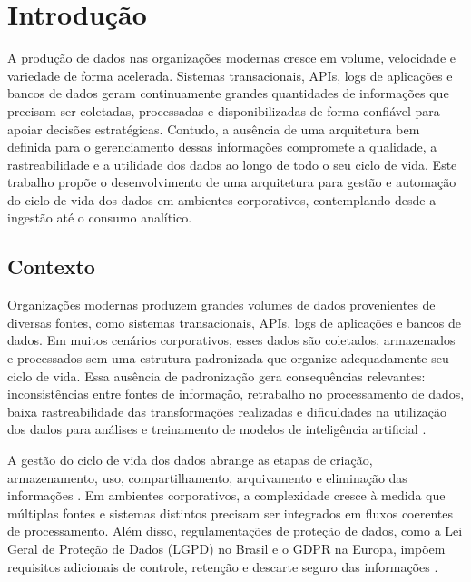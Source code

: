 \documentclass[
    12pt,                %
    openright,           %
    oneside,             %
    a4paper,             %
    english,             %
    brazil               %
]{abntex2}
\begin{document}
\chapter{Introdução}
\label{cap:introducao}

A produção de dados nas organizações modernas cresce em volume, velocidade e variedade de forma acelerada. Sistemas transacionais, APIs, logs de aplicações e bancos de dados geram continuamente grandes quantidades de informações que precisam ser coletadas, processadas e disponibilizadas de forma confiável para apoiar decisões estratégicas. Contudo, a ausência de uma arquitetura bem definida para o gerenciamento dessas informações compromete a qualidade, a rastreabilidade e a utilidade dos dados ao longo de todo o seu ciclo de vida. Este trabalho propõe o desenvolvimento de uma arquitetura para gestão e automação do ciclo de vida dos dados em ambientes corporativos, contemplando desde a ingestão até o consumo analítico.

\section{Contexto}
\label{sec:contexto}

Organizações modernas produzem grandes volumes de dados provenientes de diversas fontes, como sistemas transacionais, APIs, logs de aplicações e bancos de dados. Em muitos cenários corporativos, esses dados são coletados, armazenados e processados sem uma estrutura padronizada que organize adequadamente seu ciclo de vida. Essa ausência de padronização gera consequências relevantes: inconsistências entre fontes de informação, retrabalho no processamento de dados, baixa rastreabilidade das transformações realizadas e dificuldades na utilização dos dados para análises e treinamento de modelos de inteligência artificial \cite{Shah2021}.

A gestão do ciclo de vida dos dados abrange as etapas de criação, armazenamento, uso, compartilhamento, arquivamento e eliminação das informações \cite{Shah2021}. Em ambientes corporativos, a complexidade cresce à medida que múltiplas fontes e sistemas distintos precisam ser integrados em fluxos coerentes de processamento. Além disso, regulamentações de proteção de dados, como a Lei Geral de Proteção de Dados (LGPD) no Brasil e o GDPR na Europa, impõem requisitos adicionais de controle, retenção e descarte seguro das informações \cite{Scope2022}.
\end{document}
